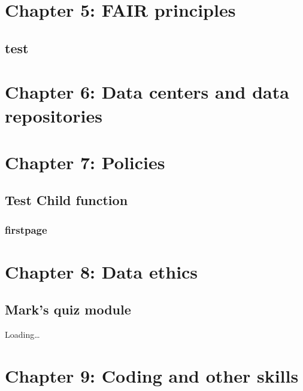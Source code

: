 \documentclass[
]{book}
\theoremstyle{definition}
\theoremstyle{definition}
\theoremstyle{definition}
\theoremstyle{definition}
\theoremstyle{remark}
\begin{document}
\hypertarget{chapter-5-fair-principles}{%
\chapter{Chapter 5: FAIR principles}\label{chapter-5-fair-principles}}

\hypertarget{test}{%
\section{test}\label{test}}

\hypertarget{chapter-6-data-centers-and-data-repositories}{%
\chapter{Chapter 6: Data centers and data repositories}\label{chapter-6-data-centers-and-data-repositories}}

\hypertarget{chapter-7-policies}{%
\chapter{Chapter 7: Policies}\label{chapter-7-policies}}

\hypertarget{test-child-function}{%
\section{Test Child function}\label{test-child-function}}

\hypertarget{firstpage}{%
\subsection{firstpage}\label{firstpage}}

\hypertarget{chapter-8-data-ethics}{%
\chapter{Chapter 8: Data ethics}\label{chapter-8-data-ethics}}

\hypertarget{marks-quiz-module}{%
\section{Mark's quiz module}\label{marks-quiz-module}}

Loading\ldots{}

\hypertarget{chapter-9-coding-and-other-skills}{%
\chapter{Chapter 9: Coding and other skills}\label{chapter-9-coding-and-other-skills}}
\end{document}

